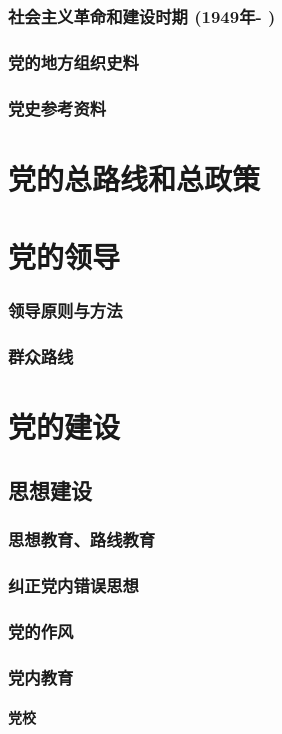 \documentclass[UTF8]{../RepresentationUniverse}
\begin{document}
    \subsubsection{社会主义革命和建设时期 (1949年- )}
    \subsubsection{党的地方组织史料}
    \subsubsection{党史参考资料}

\section{党的总路线和总政策}
\section{党的领导}
    \subsubsection{领导原则与方法}
    \subsubsection{群众路线}

\section{党的建设}
    \subsection{思想建设}
        \subsubsection{思想教育、路线教育}
        \subsubsection{纠正党内错误思想}
        \subsubsection{党的作风}
        \subsubsection{党内教育}
            \paragraph{党校}
\end{document}
